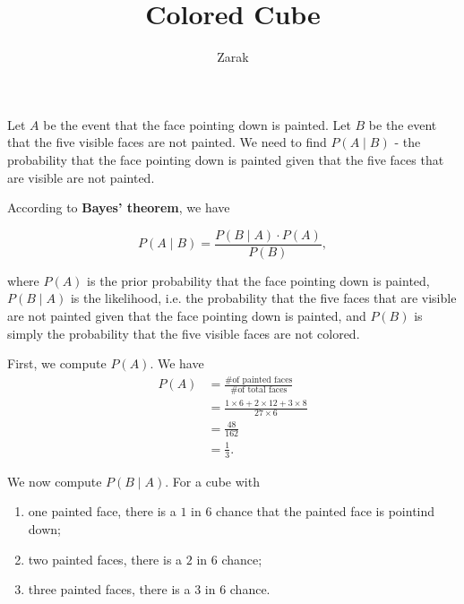 \documentclass{article}
\title{Colored Cube}
\author{Zarak}
\theoremstyle{mytheoremstyle}
\theoremstyle{mytheoremstyle}
\theoremstyle{myproblemstyle}
\begin{document}
    \maketitle

    Let \( A \) be the event that the face pointing down is painted. Let \( B
    \) be the event that the five visible faces are not painted. We need to
    find \( P(A \mid B) \) - the probability that the face pointing down is
    painted given that the five faces that are visible are not painted.

    According to \textbf{Bayes' theorem}, we have

    \begin{definition}
      
      \begin{displaymath}
      P(A \mid B) = \frac{P(B \mid A) \cdot P(A)}{P(B)},
      \end{displaymath}
      
    \end{definition}
    

    where \( P(A) \) is the prior probability that the face pointing down is
    painted, \( P(B \mid A) \) is the likelihood, i.e. the probability that the
    five faces that are visible are not painted given that the face pointing
    down is painted, and \( P(B) \) is simply the probability that the five
    visible faces are not colored.

    First, we compute \( P(A) \). We have 
    \begin{align*}
      P(A) &= \frac{\text{\# of painted faces}}{\text{\# of total faces}} \\
           &= \frac{1 \times 6 + 2 \times 12 + 3 \times 8}{27 \times 6} \\
           &= \frac{48}{162} \\
           &= \frac{1}{3}.
    \end{align*}

    We now compute \( P(B \mid A) \). For a cube with 
    \begin{enumerate}
      \item one painted face, there is a \( 1 \) in \( 6 \) chance that the
        painted face is pointind down;
      \item two painted faces, there is a \( 2 \) in \( 6 \) chance;
      \item three painted faces, there is a \( 3 \) in \( 6 \) chance.
    \end{enumerate}
\end{document}
